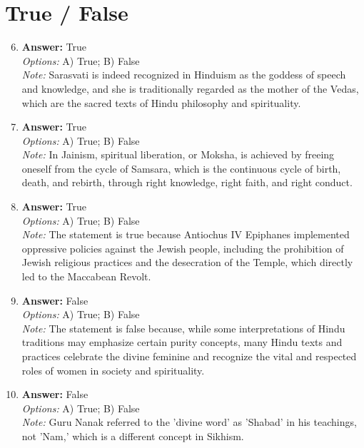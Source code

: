 \documentclass[12pt]{article}
\begin{document}
\section*{True / False}
\begin{enumerate}[label=\arabic*.]
\setcounter{enumi}{5}
\item \textbf{Answer:} True
\\ \textit{Options:} A) True; B) False
\\ \textit{Note:} Sarasvati is indeed recognized in Hinduism as the goddess of speech and knowledge, and she is traditionally regarded as the mother of the Vedas, which are the sacred texts of Hindu philosophy and spirituality.
\item \textbf{Answer:} True
\\ \textit{Options:} A) True; B) False
\\ \textit{Note:} In Jainism, spiritual liberation, or Moksha, is achieved by freeing oneself from the cycle of Samsara, which is the continuous cycle of birth, death, and rebirth, through right knowledge, right faith, and right conduct.
\item \textbf{Answer:} True
\\ \textit{Options:} A) True; B) False
\\ \textit{Note:} The statement is true because Antiochus IV Epiphanes implemented oppressive policies against the Jewish people, including the prohibition of Jewish religious practices and the desecration of the Temple, which directly led to the Maccabean Revolt.
\item \textbf{Answer:} False
\\ \textit{Options:} A) True; B) False
\\ \textit{Note:} The statement is false because, while some interpretations of Hindu traditions may emphasize certain purity concepts, many Hindu texts and practices celebrate the divine feminine and recognize the vital and respected roles of women in society and spirituality.
\item \textbf{Answer:} False
\\ \textit{Options:} A) True; B) False
\\ \textit{Note:} Guru Nanak referred to the 'divine word' as 'Shabad' in his teachings, not 'Nam,' which is a different concept in Sikhism.
\end{enumerate}
\end{document}
